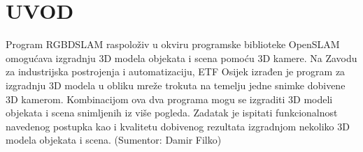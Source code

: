 \newpage

\setcounter{page}{1}
\setcounter{figure}{0}
\section{\MakeUppercase{\textbf{Uvod}}}

Program RGBDSLAM raspoloživ u okviru programske biblioteke OpenSLAM
omogućava izgradnju 3D modela objekata i scena pomoću 3D kamere. Na
Zavodu za industrijska postrojenja i automatizaciju, ETF Osijek izrađen
je program za izgradnju 3D modela u obliku mreže trokuta na temelju
jedne snimke dobivene 3D kamerom. Kombinacijom ova dva programa mogu se
izgraditi 3D modeli objekata i scena snimljenih iz više pogleda. Zadatak
je ispitati funkcionalnost navedenog postupka kao i kvalitetu dobivenog
rezultata izgradnjom nekoliko 3D modela objekata i scena. (Sumentor:
Damir Filko)
